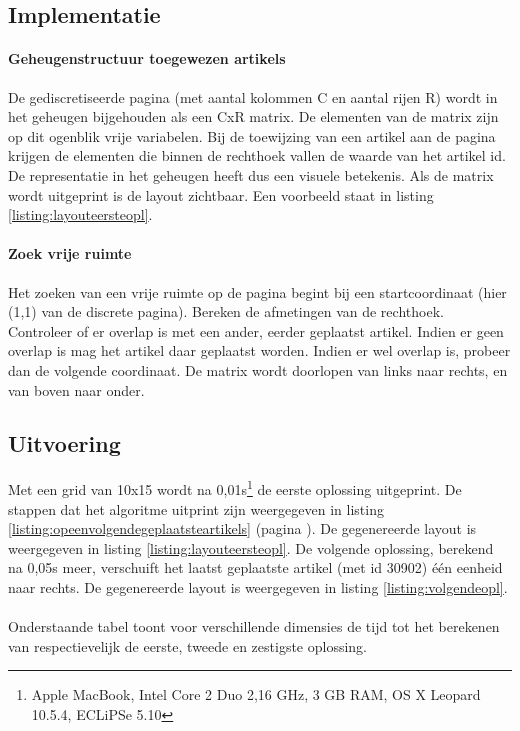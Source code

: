 \documentclass[a4paper,12pt]{report}
\begin{document}
		\subsection{Implementatie}
\paragraph{Geheugenstructuur toegewezen artikels} De gediscretiseerde pagina (met aantal kolommen C en aantal rijen R) wordt in het geheugen bijgehouden als een CxR matrix. De elementen van de matrix zijn op dit ogenblik vrije variabelen. Bij de toewijzing van een artikel aan de pagina krijgen de elementen die binnen de rechthoek vallen de waarde van het artikel id. De representatie in het geheugen heeft dus een visuele betekenis. Als de matrix wordt uitgeprint is de layout zichtbaar. Een voorbeeld staat in listing \ref{listing:layouteersteopl}.

\paragraph{Zoek vrije ruimte} Het zoeken van een vrije ruimte op de pagina begint bij een startcoordinaat (hier (1,1) van de discrete pagina). Bereken de afmetingen van de rechthoek. Controleer of er overlap is met een ander, eerder geplaatst artikel. Indien er geen overlap is mag het artikel daar geplaatst worden. Indien er wel overlap is, probeer dan de volgende coordinaat. De matrix wordt doorlopen van links naar rechts, en van boven naar onder.
			
		\subsection{Uitvoering}
Met een grid van 10x15 wordt na 0,01s\footnote{Apple MacBook, Intel Core 2 Duo 2,16 GHz, 3 GB RAM, OS X Leopard 10.5.4, ECLiPSe 5.10} de eerste oplossing uitgeprint. De stappen dat het algoritme uitprint zijn weergegeven in listing \ref{listing:opeenvolgendegeplaatsteartikels} (pagina \pageref{listing:opeenvolgendegeplaatsteartikels}). De gegenereerde layout is weergegeven in listing \ref{listing:layouteersteopl}. De volgende oplossing, berekend na 0,05s meer, verschuift het laatst geplaatste artikel (met id 30902) één eenheid naar rechts. De gegenereerde layout is weergegeven in listing \ref{listing:volgendeopl}.
\\
\\
Onderstaande tabel toont voor verschillende dimensies de tijd tot het berekenen van respectievelijk de eerste, tweede en zestigste oplossing.
      
\end{document}
